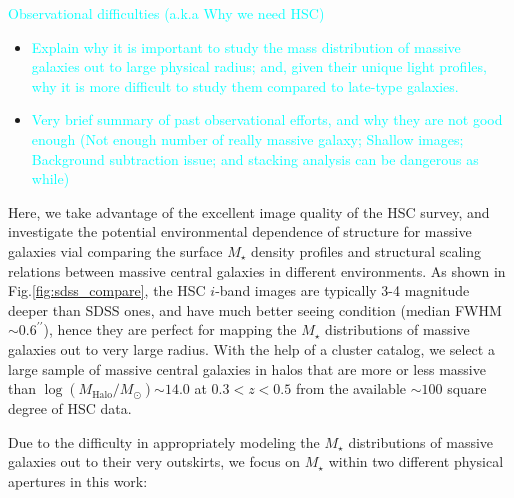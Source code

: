 \documentclass{emulateapj}
\def\arcsec{{\prime\prime}}
\def\mstar{{$M_{\star}$}}
\def\logmh{{$\log (M_{\mathrm{Halo}}/M_{\odot})$}}
\newcommand{\plan}[1]{\textcolor{cyan}{#1}}
\begin{document}
\begin{CJK*}{UTF8}{gbsn}
    \plan{Observational difficulties (a.k.a Why we need HSC)}
    \begin{itemize}
        \item \plan{Explain why it is important to study the mass distribution of 
            massive galaxies out to large physical radius; and, given their unique light 
            profiles, why it is more difficult to study them compared to late-type 
            galaxies.}
        \item \plan{Very brief summary of past observational efforts, and why they are not 
            good enough (Not enough number of really massive galaxy; Shallow images; 
            Background subtraction issue; and stacking analysis can be dangerous as while)}
    \end{itemize}
    
    Here, we take advantage of the excellent image quality of the HSC survey, and 
    investigate the potential environmental dependence of structure for massive galaxies 
    vial comparing the surface \mstar{} density profiles and structural scaling relations 
    between massive central galaxies in different environments. 
    As shown in Fig.\ref{fig:sdss_compare}, the HSC $i$-band images are typically 3-4 
    magnitude deeper than SDSS ones, and have much better seeing condition 
    (median FWHM$\sim 0.6^{\arcsec}$), hence they are perfect for mapping the \mstar{}
    distributions of massive galaxies out to very large radius. 
    With the help of a cluster catalog, we select a large sample of massive central 
    galaxies in halos that are more or less massive than \logmh{}$\sim 14.0$ at 
    $0.3 < z < 0.5$ from the available $\sim 100$ square degree of HSC data.
    
    Due to the difficulty in appropriately modeling the \mstar{} distributions of 
    massive galaxies out to their very outskirts, we focus on \mstar{} within two different 
    physical apertures in this work:
    

\end{CJK*}
\end{document}
